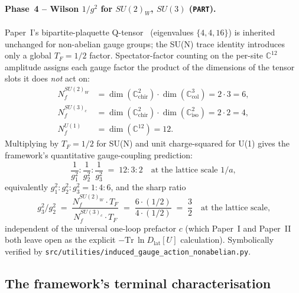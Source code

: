 \paragraph{Phase~4 -- Wilson $1/g^2$ for $SU(2)_W$, $SU(3)$ (\texttt{PART}).}
Paper~I's bipartite-plaquette Q-tensor~\cite{wilson1974confinement}
(eigenvalues $\{4, 4, 16\}$) is inherited unchanged for
non-abelian gauge groups; the SU(N) trace identity introduces
only a global $T_F = 1/2$ factor.  Spectator-factor counting on
the per-site $\mathbb{C}^{12}$ amplitude assigns each gauge factor
the product of the dimensions of the tensor slots it does \emph{not}
act on:
\begin{align}
N_f^{SU(2)_W} &= \dim(\mathbb{C}^2_\text{chir}) \cdot \dim(\mathbb{C}^3_\text{col}) = 2 \cdot 3 = 6, \nonumber\\
N_f^{SU(3)_c} &= \dim(\mathbb{C}^2_\text{chir}) \cdot \dim(\mathbb{C}^2_\text{iso}) = 2 \cdot 2 = 4, \nonumber\\
N_f^{U(1)} &= \dim(\mathbb{C}^{12}) = 12. \nonumber
\end{align}
Multiplying by $T_F = 1/2$ for SU(N) and unit charge-squared for
U(1) gives the framework's quantitative gauge-coupling prediction:
\begin{equation}
\label{eq:lattice_scale_ratios}
\frac{1}{g_1^2} : \frac{1}{g_2^2} : \frac{1}{g_3^2} \;=\; 12 : 3 : 2 \quad \text{at the lattice scale } 1/a,
\end{equation}
equivalently $g_1^2 : g_2^2 : g_3^2 = 1 : 4 : 6$, and the sharp
ratio
\begin{equation}
\label{eq:g3_over_g2}
g_3^2 / g_2^2 \;=\; \frac{N_f^{SU(2)_W} \cdot T_F}{N_f^{SU(3)_c} \cdot T_F} \;=\; \frac{6 \cdot (1/2)}{4 \cdot (1/2)} \;=\; \frac{3}{2} \quad \text{at the lattice scale,}
\end{equation}
independent of the universal one-loop prefactor $c$ (which
Paper~I and Paper~II both leave open as the explicit
$-\mathrm{Tr}\,\ln D_\text{lat}[U]$ calculation).  Symbolically
verified by \nolinkurl{src/utilities/induced_gauge_action_nonabelian.py}.

\subsection{The framework's terminal characterisation}
\label{subsec:terminal_characterisation}

\begin{figure}[H]
    \centering
    
\end{figure}

